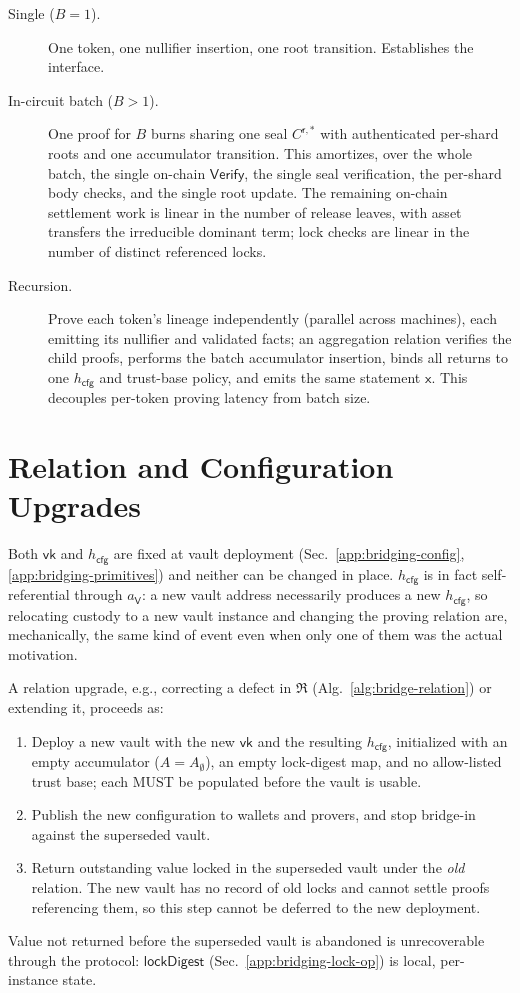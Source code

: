 \begin{description}
  \item[Single ($B=1$).] One token, one nullifier insertion, one root transition. Establishes the interface.
  \item[In-circuit batch ($B>1$).] One proof for $B$ burns sharing one seal $C^{\mathsf r,*}$ with authenticated per-shard roots and one accumulator transition. This amortizes, over the whole batch, the single on-chain $\mathsf{Verify}$, the single seal verification, the per-shard body checks, and the single root update. The remaining on-chain settlement work is linear in the number of release leaves, with asset transfers the irreducible dominant term; lock checks are linear in the number of distinct referenced locks.
  \item[Recursion.] Prove each token's lineage independently (parallel across machines), each emitting its nullifier and validated facts; an aggregation relation verifies the child proofs, performs the batch accumulator insertion, binds all returns to one $h_\mathsf{cfg}$ and trust-base policy, and emits the same statement $\mathsf{x}$. This decouples per-token proving latency from batch size.
\end{description}

\section{Relation and Configuration Upgrades}\label{app:bridging-upgrades}

Both $\mathsf{vk}$ and $h_\mathsf{cfg}$ are fixed at vault deployment (Sec.~\ref{app:bridging-config}, \ref{app:bridging-primitives}) and neither can be changed in place. $h_\mathsf{cfg}$ is in fact self-referential through $a_\mathsf{V}$: a new vault address necessarily produces a new $h_\mathsf{cfg}$, so relocating custody to a new vault instance and changing the proving relation are, mechanically, the same kind of event even when only one of them was the actual motivation.

A relation upgrade, e.g., correcting a defect in $\mathfrak{R}$ (Alg.~\ref{alg:bridge-relation}) or extending it, proceeds as:
\begin{enumerate}
  \item Deploy a new vault with the new $\mathsf{vk}$ and the resulting $h_\mathsf{cfg}$, initialized with an empty accumulator ($A = A_\emptyset$), an empty lock-digest map, and no allow-listed trust base; each MUST be populated before the vault is usable.
  \item Publish the new configuration to wallets and provers, and stop bridge-in against the superseded vault.
  \item Return outstanding value locked in the superseded vault under the \emph{old} relation. The new vault has no record of old locks and cannot settle proofs referencing them, so this step cannot be deferred to the new deployment.
\end{enumerate}
Value not returned before the superseded vault is abandoned is unrecoverable through the protocol: $\mathsf{lockDigest}$ (Sec.~\ref{app:bridging-lock-op}) is local, per-instance state.

